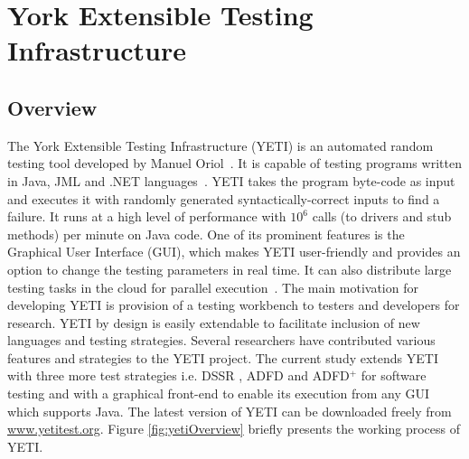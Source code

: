 
\chapter{York Extensible Testing Infrastructure}
\label{chap:yeti_3}





\section{Overview}
The York Extensible Testing Infrastructure (YETI) is an automated random testing tool developed by Manuel Oriol~\cite{Oriol2011yeti}. It is capable of testing programs written in Java, JML and .NET languages~\cite{oriol2010testing}. YETI takes the program byte-code as input and executes it with randomly generated syntactically-correct inputs to find a failure. It runs at a high level of performance with $10^6$ calls (to drivers and stub methods) per minute on Java code. One of its prominent features is the Graphical User Interface (GUI), which makes YETI user-friendly and provides an option to change the testing parameters in real time. It can also distribute large testing tasks in the cloud for parallel execution~\cite{oriol2010yeti}. The main motivation for developing YETI is provision of a testing workbench to testers and developers for research. YETI by design is easily extendable to facilitate inclusion of new languages and testing strategies. Several researchers \cite{oriol2010testing, oriol2010yeti, Dimitraiadis2009, Khawaja2010} have contributed various features and strategies to the YETI project. The current study extends YETI with three more test strategies i.e. DSSR \cite{ahmad2014dirt}, ADFD \cite{ahmad2013adfd} and ADFD$^+$ \cite{ahmad2014adfd2} for software testing and with a graphical front-end to enable its execution from any GUI which supports Java. The latest version of YETI can be downloaded freely from \url{www.yetitest.org}. Figure \ref{fig:yetiOverview} briefly presents the working process of YETI. 

